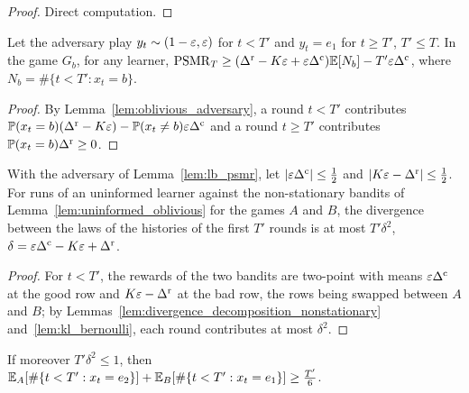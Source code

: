\begin{proof}
  \leanok
  Direct computation.
\end{proof}

\begin{lemma}
  \label{lem:lb_psmr}
  \leanok
  Let the adversary play $y_t \sim (1 - \varepsilon, \varepsilon)$ for $t < T'$ and $y_t = e_1$ for $t \ge T'$,
  $T' \le T$. In the game $G_b$, for any learner,
  $\mathrm{PSMR}_T \ge (\Delta^{\mathrm{r}} - K\varepsilon + \varepsilon\Delta^{\mathrm{c}}) \mathbb{E}[N_b] - T' \varepsilon \Delta^{\mathrm{c}}$, where
  $N_b = \#\{t < T' : x_t = b\}$.
\end{lemma}

\begin{proof}
  \leanok
  By Lemma~\ref{lem:oblivious_adversary}, a round $t < T'$ contributes
  $\mathbb{P}(x_t = b)(\Delta^{\mathrm{r}} - K \varepsilon) - \mathbb{P}(x_t \ne b) \varepsilon \Delta^{\mathrm{c}}$ and a round $t \ge T'$ contributes
  $\mathbb{P}(x_t = b) \Delta^{\mathrm{r}} \ge 0$.
\end{proof}

\begin{lemma}
  \label{lem:lb_kl}
  \leanok
  With the adversary of Lemma~\ref{lem:lb_psmr}, let $\lvert \varepsilon \Delta^{\mathrm{c}} \rvert \le \frac12$ and
  $\lvert K \varepsilon - \Delta^{\mathrm{r}} \rvert \le \frac12$. For runs of an uninformed learner against the non-stationary
  bandits of Lemma~\ref{lem:uninformed_oblivious} for the games $A$ and $B$, the divergence between
  the laws of the histories of the first $T'$ rounds is at most $T' \delta^2$,
  $\delta = \varepsilon\Delta^{\mathrm{c}} - K\varepsilon + \Delta^{\mathrm{r}}$.
\end{lemma}

\begin{proof}
  \leanok
  For $t < T'$, the rewards of the two bandits are two-point with means $\varepsilon\Delta^{\mathrm{c}}$ at the good row
  and $K\varepsilon - \Delta^{\mathrm{r}}$ at the bad row, the rows being swapped between $A$ and $B$; by
  Lemmas~\ref{lem:divergence_decomposition_nonstationary} and~\ref{lem:kl_bernoulli}, each round
  contributes at most $\delta^2$.
\end{proof}

\begin{lemma}
  \label{lem:lb_bh}
  \leanok
  If moreover $T' \delta^2 \le 1$, then
  $\mathbb{E}_A[\#\{t < T' : x_t = e_2\}] + \mathbb{E}_B[\#\{t < T' : x_t = e_1\}] \ge \frac{T'}{6}$.
\end{lemma}

